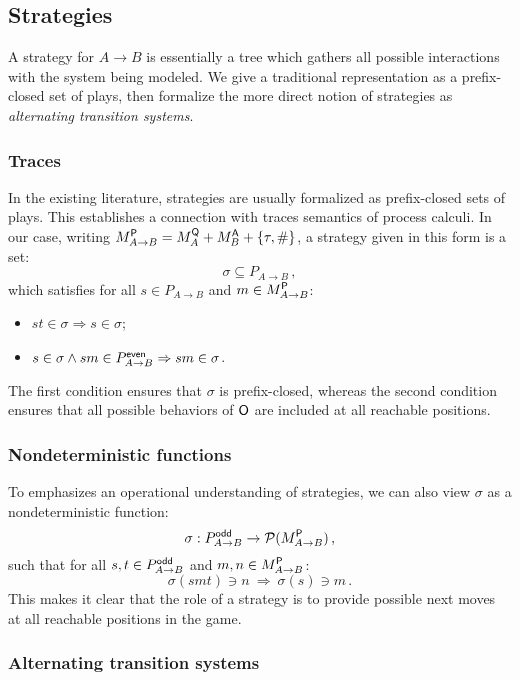 \subsection{Strategies}

A strategy for $A \rightarrow B$
is essentially a tree
which gathers all possible interactions with
the system being modeled.
We give a traditional representation
as a prefix-closed set of plays,
then formalize the more direct notion of strategies as
\emph{alternating transition systems}.

\subsubsection{Traces}

In the existing literature,
strategies are usually formalized as prefix-closed sets of plays.
This establishes a connection with traces semantics of process calculi.
In our case,
writing
$M_{A \rightarrow B}^{ \mathsf{P} } = M_A^{ \mathsf{Q} } + M_B^{ \mathsf{A} } + \{\tau, \# \}$,
a strategy given in this form is a set:
\[ \sigma \subseteq P_{A \rightarrow B} \,, \]
which satisfies
for all $s \in P_{A \rightarrow B}$ and $m \in M_{A \rightarrow B}^{ \mathsf{P} }$:
\begin{itemize}
  \item $st \in \sigma \Rightarrow s \in \sigma$;
  \item $s \in \sigma \wedge sm \in P_{A \rightarrow B}^{ \mathsf{even} }
    \Rightarrow sm \in \sigma$.
\end{itemize}
The first condition ensures that $\sigma$ is prefix-closed,
whereas the second condition ensures that
all possible behaviors of $ \mathsf{O} $ are included
at all reachable positions.

\subsubsection{Nondeterministic functions}

To emphasizes an operational understanding of strategies,
we can also view $\sigma$ as a nondeterministic function:
\[ \sigma : P_{A \rightarrow B}^{ \mathsf{odd} } \rightarrow
        \mathcal{P}(M_{A \rightarrow B}^{ \mathsf{P} }) \,, \]
such that for all $s, t \in P_{A \rightarrow B}^{ \mathsf{odd} }$
and $m, n \in M_{A \rightarrow B}^{ \mathsf{P} }$:
\[ \sigma(s m t) \ni n \: \Rightarrow \: \sigma(s) \ni m \,. \]
This makes it clear that the role of a strategy
is to provide possible next moves at all reachable positions
in the game.

\subsubsection{Alternating transition systems}

